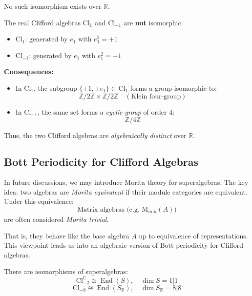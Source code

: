 \begin{remark}
    No such isomorphism exists over $\mathbb{R}$.
\end{remark}

\begin{example}
    The real Clifford algebras $\mathrm{Cl}_1$ and $\mathrm{Cl}_{-1}$ are \textbf{not} isomorphic.

\begin{itemize}
    \item $\mathrm{Cl}_1$: generated by $e_1$ with $e_1^2 = +1$
    \item $\mathrm{Cl}_{-1}$: generated by $e_1$ with $e_1^2 = -1$
\end{itemize}

\textbf{Consequences:}
\begin{itemize}
    \item In $\mathrm{Cl}_1$, the subgroup $\{ \pm 1, \pm e_1 \} \subset \mathrm{Cl}_1$ forms a group isomorphic to:
    \[
    \mathbb{Z}/2\mathbb{Z} \times \mathbb{Z}/2\mathbb{Z} \quad (\text{Klein four-group})
    \]
    \item In $\mathrm{Cl}_{-1}$, the same set forms a \emph{cyclic group} of order 4:
    \[
    \mathbb{Z}/4\mathbb{Z}
    \]
\end{itemize}

Thus, the two Clifford algebras are \emph{algebraically distinct} over $\mathbb{R}$.
\end{example}

\subsection{Bott Periodicity for Clifford Algebras}

In future discussions, we may introduce Morita theory for superalgebras. The key idea: two algebras are \emph{Morita equivalent} if their module categories are equivalent. Under this equivalence:
    \[
    \text{Matrix algebras (e.g. } \mathrm{M}_{m|n}(A) \text{)}
    \]
    are often considered \emph{Morita trivial}.
    
    That is, they behave like the base algebra $A$ up to equivalence of representations.
This viewpoint leads us into an algebraic version of Bott periodicity for Clifford algebras.

\begin{theorem}
There are isomorphisms of superalgebras:
\[
\mathrm{Cl}^{\mathbb{C}}_{-2} \cong \operatorname{End}(S), \quad \dim S = 1|1
\]
\[
\mathrm{Cl}_{-8} \cong \operatorname{End}(S_{\mathbb{R}}), \quad \dim S_{\mathbb{R}} = 8|8
\]
\end{theorem}

